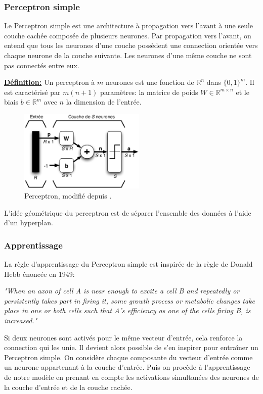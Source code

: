 \subsubsection{Perceptron simple}

Le Perceptron simple est une architecture à propagation vers l'avant à une
seule couche cachée composée de plusieurs neurones. Par propagation vers
l'avant, on entend que tous les neurones d'une couche possèdent une connection
orientée vers chaque neurone de la couche suivante. Les neurones d'une même
couche ne sont pas connectés entre eux.

\textbf{\underline{Définition:}} Un perceptron à $m$ neurones est une fonction
de $\mathbb{R}^{n}$ dans $\lbrace 0,1\rbrace^{m}$. Il est caractérisé par
$m(n+1)$ paramètres: la matrice de poids $W\in\mathbb{R}^{m\times n}$ et le
biais $b\in\mathbb{R}^{m}$ avec $n$ la dimension de l'entrée.

\begin{figure}
\begin{center}
\includegraphics[width=6cm]{predoc/images/percep.eps}
\end{center}
\caption{\label{fig:percep} Perceptron, modifié depuis \cite{parizeau}.}
\end{figure}

L'idée géométrique du perceptron est de séparer l'ensemble des données à l'aide
d'un hyperplan.

\subsubsection{Apprentissage}

La règle d'apprentissage du Perceptron simple est inspirée de la règle de
Donald Hebb énoncée en 1949:

\textit{"When an axon of cell A is near enough to excite a cell B and
repeatedly or persistently takes part in firing it, some growth process or
metabolic changes take place in one or both cells such that A’s efficiency as
one of the cells firing B, is increased."}

Si deux neurones sont activés pour le même vecteur d'entrée, cela renforce la
connection qui les unie. Il devient alors possible de s'en inspirer pour
entraîner un Perceptron simple. On considère chaque composante du vecteur
d'entrée comme un neurone appartenant à la couche d'entrée. Puis on procède à
l'apprentissage de notre modèle en prenant en compte les activations
simultanées des neurones de la couche d'entrée et de la couche cachée.

